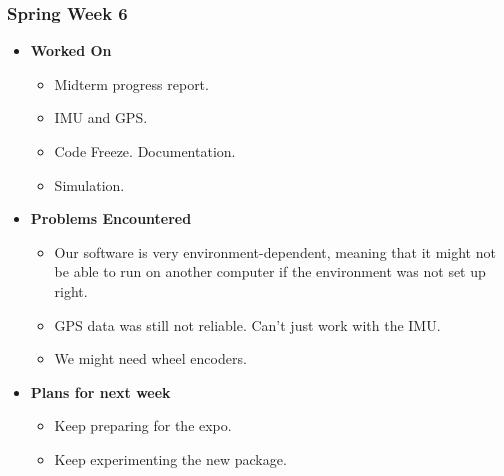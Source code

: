 \documentclass{article}
\begin{document}
\subsubsection{Spring Week 6}
\begin{itemize}
    \item {\textbf{Worked On}}
    \begin{itemize}
      \item Midterm progress report.
      \item IMU and GPS.
      \item Code Freeze. Documentation.
      \item Simulation.
    \end{itemize}

    \item {\textbf{Problems Encountered}}
    \begin{itemize}
      \item Our software is very environment-dependent, meaning that it might not
      be able to run on another computer if the environment was not set up right.
      \item GPS data was still not reliable. Can't just work with the IMU.
      \item We might need wheel encoders.
    \end{itemize}

    \item{\textbf{Plans for next week}}
    \begin{itemize}
      \item Keep preparing for the expo.
      \item Keep experimenting the new package.
    \end{itemize}

\end{itemize}
\end{document}
